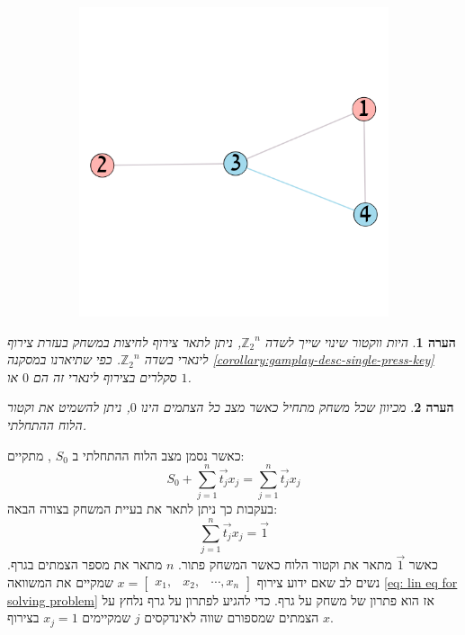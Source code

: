 \documentclass[12pt,leqno]{article}
\theoremstyle{theoremdd}
\newtheorem{comm}{הערה}[section]
\newcommand{\sumi}[1]{\sum_{#1=1}^n}
\newcommand{\Zn}{{\mathbb{Z}_2}^n}
\begin{document}
\begin{figure}[ht]
\begin{subfigure}[b]{.4\linewidth}
        \includegraphics[width=.7\textwidth,keepaspectratio]{images/graph_presses_solve.png}
    \end{subfigure}
\end{figure}

\begin{comm}
    היות ווקטור שינוי שייך לשדה
    $\Zn$,
    ניתן לתאר צירוף לחיצות במשחק 
    בעזרת צירוף לינארי 
    בשדה 
    $\Zn$.
    כפי שתיארנו במסקנה 
    \ref{corollary:gamplay-desc-single-press-key}
    סקלרים בצירוף לינארי זה הם
    $0$
    או 
    $1$.
\end{comm}
\begin{comm}
    מכיוון שכל משחק מתחיל 
    כאשר מצב כל הצתמים הינו 
    $0$,
    ניתן 
    להשמיט
    את וקטור הלוח 
    ההתחלתי.
\end{comm}

כאשר
נסמן מצב הלוח ההתחלתי 
ב
$S_0$
,
מתקיים:
\begin{equation}
    \label{eq: sum change vectors}
    S_0 + \sumi{j} \vec{t_j} x_j=  \sumi{j}  \vec{t_j}x_j
\end{equation}
בעקבות כך ניתן לתאר את בעיית המשחק בצורה הבאה:
\begin{equation}
    \label{eq: lin eq for solving problem}
    \sumi{j} \vec{t_j} x_j = \vec{1}
\end{equation}
כאשר
$\vec{1}$
מתאר 
את וקטור הלוח כאשר המשחק פתור.
$n$
מתאר
את
מספר הצמתים בגרף.
נשים לב 
שאם 
ידוע צירוף
$x = \begin{bmatrix}
    x_1, & x_2, & \cdots , x_n
\end{bmatrix}$
שמקיים את המשוואה 
\ref{eq: lin eq for solving problem}
אז הוא פתרון של משחק על גרף.
כדי להגיע לפתרון על גרף נלחץ על הצמתים שמספורם 
שווה 
לאינדקסים 
$j$
שמקיימים
$x_j = 1$
בצירוף 
$x$.
\end{document}
